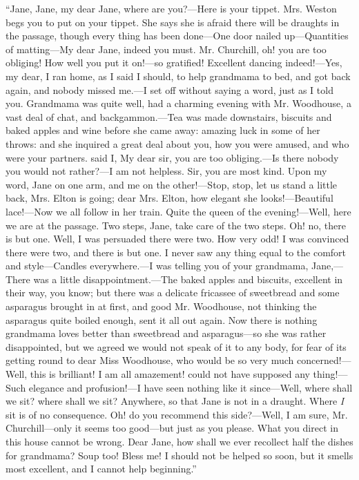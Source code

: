 “Jane, Jane, my dear Jane, where are you?---Here is your tippet. Mrs. Weston begs you to put on your tippet. She says she is afraid there will be draughts in the passage, though every thing has been done---One door nailed up---Quantities of matting---My dear Jane, indeed you must. Mr. Churchill, oh! you are too obliging! How well you put it on!---so gratified! Excellent dancing indeed!---Yes, my dear, I ran home, as I said I should, to help grandmama to bed, and got back again, and nobody missed me.---I set off without saying a word, just as I told you. Grandmama was quite well, had a charming evening with Mr. Woodhouse, a vast deal of chat, and backgammon.---Tea was made downstairs, biscuits and baked apples and wine before she came away: amazing luck in some of her throws: and she inquired a great deal about you, how you were amused, and who were your partners.  said I,  My dear sir, you are too obliging.---Is there nobody you would not rather?---I am not helpless. Sir, you are most kind. Upon my word, Jane on one arm, and me on the other!---Stop, stop, let us stand a little back, Mrs. Elton is going; dear Mrs. Elton, how elegant she looks!---Beautiful lace!---Now we all follow in her train. Quite the queen of the evening!---Well, here we are at the passage. Two steps, Jane, take care of the two steps. Oh! no, there is but one. Well, I was persuaded there were two. How very odd! I was convinced there were two, and there is but one. I never saw any thing equal to the comfort and style---Candles everywhere.---I was telling you of your grandmama, Jane,---There was a little disappointment.---The baked apples and biscuits, excellent in their way, you know; but there was a delicate fricassee of sweetbread and some asparagus brought in at first, and good Mr. Woodhouse, not thinking the asparagus quite boiled enough, sent it all out again. Now there is nothing grandmama loves better than sweetbread and asparagus---so she was rather disappointed, but we agreed we would not speak of it to any body, for fear of its getting round to dear Miss Woodhouse, who would be so very much concerned!---Well, this is brilliant! I am all amazement! could not have supposed any thing!---Such elegance and profusion!---I have seen nothing like it since---Well, where shall we sit? where shall we sit? Anywhere, so that Jane is not in a draught. Where {\em I} sit is of no consequence. Oh! do you recommend this side?---Well, I am sure, Mr. Churchill---only it seems too good---but just as you please. What you direct in this house cannot be wrong. Dear Jane, how shall we ever recollect half the dishes for grandmama? Soup too! Bless me! I should not be helped so soon, but it smells most excellent, and I cannot help beginning.”

